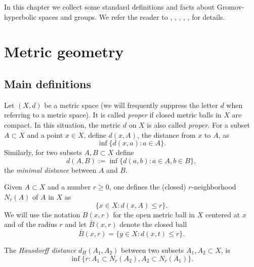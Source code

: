 \documentclass[12pt]{amsbook}%
\theoremstyle{definition}
\theoremstyle{remark}
\numberwithin{section}{chapter}
\numberwithin{subsection}{section}
\numberwithin{figure}{chapter}
\newcommand\bac[1]{{\color{blue} #1} }
\def\ol{\overline}
\def\kap{}
\begin{document}
In this chapter we collect some standard definitions and facts about Gromov-hyperbolic spaces and groups. We refer the reader to \cite{BH}, \cite{Buyalo-Schroeder}, \cite{DK18}, \cite{Ghys-book}, \cite{Gromov}, \cite{Vaisala} for details. 


\section{Metric geometry}\label{sec:metric_geometry}



\subsection{Main definitions}



Let $(X,d)$ be a metric space (we will frequently suppress the letter $d$ when referring to a metric space). 
It is called {\em proper} if closed metric balls in $X$ are compact. In this situation, the metric $d$ on $X$ is also called {\em proper}.  
For a subset $A\subset X$ and a point $x\in X$, define $d(x,A)$, the distance from $x$ to $A$, as  
$$
\inf \{d(x,a): a\in A\}.
$$ 
Similarly, for two subsets $A, B\subset X$ define 
$$
d(A,B):= \inf \{d(a,b): a\in A, b\in B\},
$$
the {\em minimal distance} between $A$ and $B$. 

Given $A\subset X$ 
and a number $r\geqslant 0$, one defines the (closed) 
$r$-neighborhood $N_r(A)$  of $A$ in $X$ as  
$$
\{x\in X: d(x, A)\leqslant r\}. 
$$
We will use the notation $B(x,r)$  
for the open metric ball in $X$ centered at $x$ and of the radius $r$ and let $\bar{B}(x,r)$ 
denote the closed ball
$$
\bar{B}(x,r)= \{y\in X: d(x,t)\leqslant r\}.
$$  

The {\em Hausdorff distance} $d_H(A_1, A_2)$ between two subsets $A_1, A_2\subset X$,  
is
$$
\inf \{r: A_1\subset N_r(A_2), A_2\subset N_r(A_1)\}. 
$$
\end{document}
